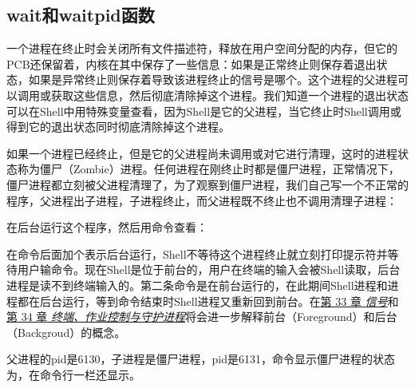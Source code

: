 
\subsection{wait和waitpid函数}
%


一个进程在终止时会关闭所有文件描述符，释放在用户空间分配的内存，但它的PCB还保留着，内核在其中保存了一些信息：如果是正常终止则保存着退出状态，如果是异常终止则保存着导致该进程终止的信号是哪个。这个进程的父进程可以调用或获取这些信息，然后彻底清除掉这个进程。我们知道一个进程的退出状态可以在Shell中用特殊变量查看，因为Shell是它的父进程，当它终止时Shell调用或得到它的退出状态同时彻底清除掉这个进程。



如果一个进程已经终止，但是它的父进程尚未调用或对它进行清理，这时的进程状态称为僵尸（Zombie）进程。任何进程在刚终止时都是僵尸进程，正常情况下，僵尸进程都立刻被父进程清理了，为了观察到僵尸进程，我们自己写一个不正常的程序，父进程出子进程，子进程终止，而父进程既不终止也不调用清理子进程：




在后台运行这个程序，然后用命令查看：




在命令后面加个\BookCode{\&}表示后台运行，Shell不等待这个进程终止就立刻打印提示符并等待用户输命令。现在Shell是位于前台的，用户在终端的输入会被Shell读取，后台进程是读不到终端输入的。第二条命令是在前台运行的，在此期间Shell进程和进程都在后台运行，等到命令结束时Shell进程又重新回到前台。在\hyperlink{db.ch33.id2883851}{第 33 章 \emph{信号}}和\hyperlink{db.ch34.id2890980}{第 34 章 \emph{终端、作业控制与守护进程}}将会进一步解释前台（Foreground）和后台（Backgroud）的概念。



父进程的pid是6130，子进程是僵尸进程，pid是6131，命令显示僵尸进程的状态为，在命令行一栏还显示。



